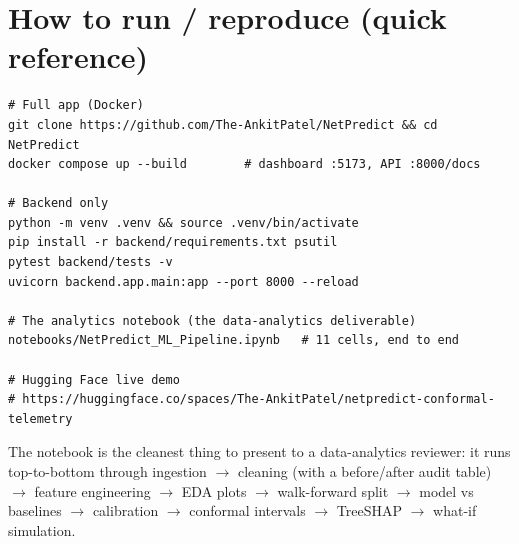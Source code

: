 \documentclass[11pt,a4paper]{article}
\begin{document}
\section{How to run / reproduce (quick reference)}
\begin{lstlisting}
# Full app (Docker)
git clone https://github.com/The-AnkitPatel/NetPredict && cd NetPredict
docker compose up --build        # dashboard :5173, API :8000/docs

# Backend only
python -m venv .venv && source .venv/bin/activate
pip install -r backend/requirements.txt psutil
pytest backend/tests -v
uvicorn backend.app.main:app --port 8000 --reload

# The analytics notebook (the data-analytics deliverable)
notebooks/NetPredict_ML_Pipeline.ipynb   # 11 cells, end to end

# Hugging Face live demo
# https://huggingface.co/spaces/The-AnkitPatel/netpredict-conformal-telemetry
\end{lstlisting}

The notebook is the cleanest thing to present to a data-analytics reviewer: it runs top-to-bottom through
ingestion $\rightarrow$ cleaning (with a before/after audit table) $\rightarrow$ feature engineering
$\rightarrow$ EDA plots $\rightarrow$ walk-forward split $\rightarrow$ model vs baselines $\rightarrow$
calibration $\rightarrow$ conformal intervals $\rightarrow$ TreeSHAP $\rightarrow$ what-if simulation.

\end{document}

